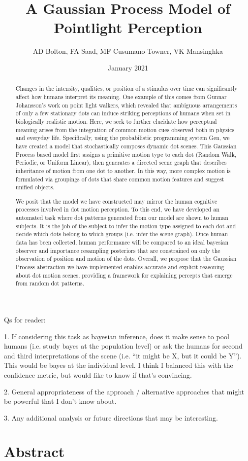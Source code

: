 \documentclass{scrartcl}
\title{A Gaussian Process Model of Pointlight Perception}
\author{AD Bolton, FA Saad, MF Cusumano-Towner, VK Mansinghka}
\date{January 2021}
\begin{document}
\maketitle

Qs for reader:

1. If considering this task as bayesian inference, does it make sense to pool humans (i.e. study bayes at the population level) or ask the humans for second and third interpretations of the scene (i.e. ``it might be X, but it could be Y''). This would be bayes at the individual level. I think I balanced this with the confidence metric, but would like to know if that's convincing. 

2. General appropriateness of the approach / alternative approaches that might be powerful that I don't know about.

3. Any additional analysis or future directions that may be interesting. 

\section{Abstract}
\begin{abstract}
  Changes in the intensity, qualities, or position of a stimulus over time can significantly affect how humans interpret its meaning. One example of this comes from Gunnar Johansson's work on point light walkers, which revealed that ambiguous arrangements of only a few stationary dots can induce striking perceptions of humans when set in biologically realistic motion. Here, we seek to further elucidate how perceptual meaning arises from the integration of common motion cues observed both in physics and everyday life. Specifically, using the probabilistic programming system Gen, we have created a model that stochastically composes dynamic dot scenes. This Gaussian Process based model first assigns a primitive motion type to each dot (Random Walk, Periodic, or Uniform Linear), then generates a directed scene graph that describes inheritance of motion from one dot to another. In this way, more complex motion is formulated via groupings of dots that share common motion features and suggest unified objects. 
  
  We posit that the model we have constructed may mirror the human cognitive processes involved in dot motion perception. To this end, we have developed an automated task where dot patterns generated from our model are shown to human subjects. It is the job of the subject to infer the motion type assigned to each dot and decide which dots belong to which groups (i.e. infer the scene graph). Once human data has been collected, human performance will be compared to an ideal bayesian observer and importance resampling posteriors that are constrained on only the observation of position and motion of the dots. Overall, we propose that the Gaussian Process abstraction we have implemented enables accurate and explicit reasoning about dot motion scenes, providing a framework for explaining percepts that emerge from random dot patterns.

  
\end{abstract}
\end{document}
